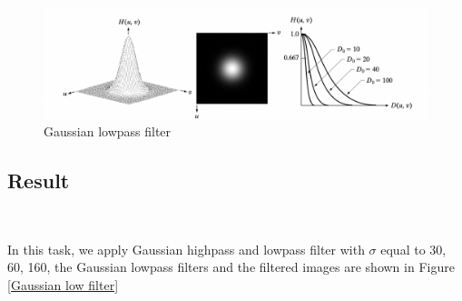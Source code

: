 \documentclass[
	12pt, %
]{style/fphw}
\begin{document}
\begin{figure}[H]
    \centering
    \includegraphics[width=0.8\linewidth]{chart/Gaussian.png}
    \caption{Gaussian lowpass filter}
    \label{Gaussian.png}
\end{figure}

\subsection*{Result} \

In this task, we apply Gaussian highpass and lowpass filter with $\sigma$ equal to 30, 60, 160, the Gaussian lowpass filters and the filtered images are shown in Figure \ref{Gaussian low filter}
\end{document}
